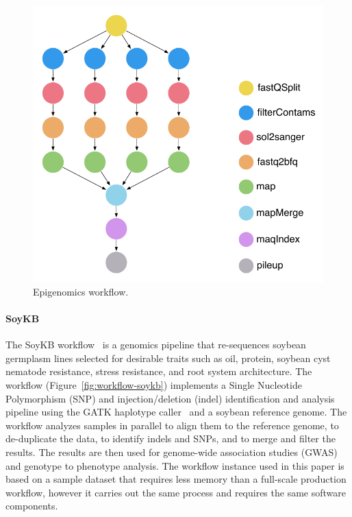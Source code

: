 \begin{figure}[!t]
	\centering
	\includegraphics[width=0.7\linewidth]{figures/workflow-genome}
	\caption{Epigenomics workflow.}
	\label{fig:workflow-genome}
\end{figure}

\paragraph{\textbf{SoyKB}}
The SoyKB workflow~\cite{soybean, Joshi01012014} is a genomics pipeline 
that re-sequences soybean germplasm lines selected for desirable traits such 
as oil, protein, soybean cyst nematode resistance, stress resistance, and root 
system architecture. The workflow (Figure~\ref{fig:workflow-soykb}) 
implements a Single Nucleotide Polymorphism (SNP)  and injection/deletion (indel) identification and analysis 
pipeline using the GATK haplotype caller~\cite{gatk} and a soybean reference 
genome. The workflow analyzes samples in parallel to align them to the reference 
genome, to de-duplicate the data, to identify indels and SNPs, and to merge and 
filter the results. The results are then used for genome-wide association studies 
(GWAS) and genotype to phenotype analysis. The workflow instance used in this 
paper is based on a sample dataset that requires less memory than a full-scale 
production workflow, however it carries out the same process and 
	requires the same software components.

